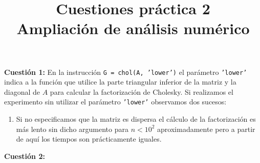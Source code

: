 \documentclass[12pt]{article}
\title{\textbf{Cuestiones práctica 2\\ {\small Ampliación de análisis numérico}}}
\date{}
\author{}
\theoremstyle{definition}
\begin{document}
	\maketitle
	
	\noindent\textbf{Cuestión 1:} En la instrucción \texttt{G = chol(A, 'lower')} el parámetro \texttt{'lower'} indica a la función que utilice la parte triangular inferior de la matriz  y la diagonal de $A$ para calcular la factorización de Cholesky. Si realizamos el experimento sin utilizar el parámetro \texttt{'lower'} observamos dos sucesos:
	\begin{enumerate}
		\item Si no especificamos que la matriz es dispersa el cálculo de la factorización es más lento sin dicho argumento para $n < 10^2$ aproximadamente pero a partir de aquí los tiempos son prácticamente iguales.
	\end{enumerate}

	\noindent\textbf{Cuestión 2:}
\end{document}

